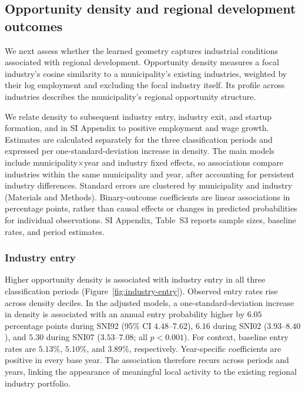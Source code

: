 \documentclass[9pt,twocolumn,twoside]{pnas-new}
\begin{document}
\subsection{Opportunity density and regional development outcomes}
\label{sec:results-opportunity-spaces}

We next assess whether the learned geometry captures industrial conditions associated with regional development. Opportunity density measures a focal industry's cosine similarity to a municipality's existing industries, weighted by their log employment and excluding the focal industry itself. Its profile across industries describes the municipality's regional opportunity structure.

We relate density to subsequent industry entry, industry exit, and startup formation, and in SI Appendix to positive employment and wage growth. Estimates are calculated separately for the three classification periods and expressed per one-standard-deviation increase in density. The main models include municipality$\times$year and industry fixed effects, so associations compare industries within the same municipality and year, after accounting for persistent industry differences. Standard errors are clustered by municipality and industry (Materials and Methods). Binary-outcome coefficients are linear associations in percentage points, rather than causal effects or changes in predicted probabilities for individual observations. SI Appendix, Table~S3 reports sample sizes, baseline rates, and period estimates.

\subsubsection{Industry entry}

Higher opportunity density is associated with industry entry in all three classification periods (Figure~\ref{fig:industry-entry}). Observed entry rates rise across density deciles. In the adjusted models, a one-standard-deviation increase in density is associated with an annual entry probability higher by $6.05$ percentage points during SNI92 (95\% CI $4.48$--$7.62$), $6.16$ during SNI02 ($3.93$--$8.40$), and $5.30$ during SNI07 ($3.53$--$7.08$; all $p<0.001$). For context, baseline entry rates are $5.13\%$, $5.10\%$, and $3.89\%$, respectively. Year-specific coefficients are positive in every base year. The association therefore recurs across periods and years, linking the appearance of meaningful local activity to the existing regional industry portfolio.
\end{document}
